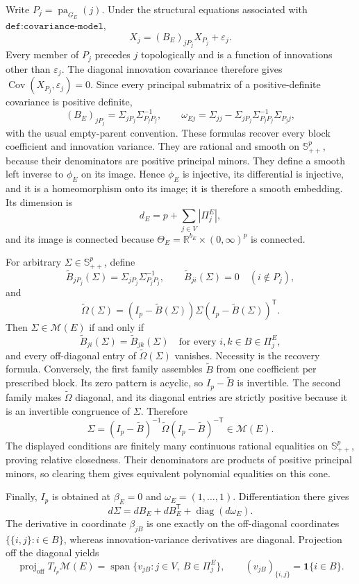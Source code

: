Write \(P_j=\operatorname{pa}_{G_E}(j)\). Under the structural equations associated with \(\texttt{def:covariance-model}\),
\[
 X_j=(B_E)_{jP_j}X_{P_j}+\varepsilon_j.
\]
Every member of \(P_j\) precedes \(j\) topologically and is a function of innovations other than \(\varepsilon_j\). The diagonal innovation covariance therefore gives \(\operatorname{Cov}(X_{P_j},\varepsilon_j)=0\). Since every principal submatrix of a positive-definite covariance is positive definite,
\[
 (B_E)_{jP_j}=\Sigma_{jP_j}\Sigma_{P_jP_j}^{-1},
 \qquad
 \omega_{Ej}=\Sigma_{jj}-\Sigma_{jP_j}\Sigma_{P_jP_j}^{-1}\Sigma_{P_jj},
\]
with the usual empty-parent convention. These formulas recover every block coefficient and innovation variance. They are rational and smooth on \(\mathbb S^p_{++}\), because their denominators are positive principal minors. They define a smooth left inverse to \(\phi_E\) on its image. Hence \(\phi_E\) is injective, its differential is injective, and it is a homeomorphism onto its image; it is therefore a smooth embedding. Its dimension is
\[
 d_E=p+\sum_{j\in V}|\Pi^E_j|,
\]
and its image is connected because \(\Theta_E=\mathbb R^{b_E}\times(0,\infty)^p\) is connected.

For arbitrary \(\Sigma\in\mathbb S^p_{++}\), define
\[
 \widetilde B_{jP_j}(\Sigma)=\Sigma_{jP_j}\Sigma_{P_jP_j}^{-1},
 \qquad
 \widetilde B_{ji}(\Sigma)=0\quad(i\notin P_j),
\]
and
\[
 \widetilde\Omega(\Sigma)
 =(I_p-\widetilde B(\Sigma))\Sigma(I_p-\widetilde B(\Sigma))^{\mathsf T}.
\]
Then \(\Sigma\in\mathcal M(E)\) if and only if
\[
 \widetilde B_{ji}(\Sigma)=\widetilde B_{jk}(\Sigma)
 \quad\text{for every }i,k\in B\in\Pi^E_j,
\]
and every off-diagonal entry of \(\widetilde\Omega(\Sigma)\) vanishes. Necessity is the recovery formula. Conversely, the first family assembles \(\widetilde B\) from one coefficient per prescribed block. Its zero pattern is acyclic, so \(I_p-\widetilde B\) is invertible. The second family makes \(\widetilde\Omega\) diagonal, and its diagonal entries are strictly positive because it is an invertible congruence of \(\Sigma\). Therefore
\[
 \Sigma=(I_p-\widetilde B)^{-1}\widetilde\Omega(I_p-\widetilde B)^{-\mathsf T}\in\mathcal M(E).
\]
The displayed conditions are finitely many continuous rational equalities on \(\mathbb S^p_{++}\), proving relative closedness. Their denominators are products of positive principal minors, so clearing them gives equivalent polynomial equalities on this cone.

Finally, \(I_p\) is obtained at \(\beta_E=0\) and \(\omega_E=(1,\ldots,1)\). Differentiation there gives
\[
 d\Sigma=dB_E+dB_E^{\mathsf T}+\operatorname{diag}(d\omega_E).
\]
The derivative in coordinate \(\beta_{jB}\) is one exactly on the off-diagonal coordinates \(\{\{i,j\}:i\in B\}\), whereas innovation-variance derivatives are diagonal. Projection off the diagonal yields
\[
 \operatorname{proj}_{\mathrm{off}}T_{I_p}\mathcal M(E)
 =\operatorname{span}\{v_{jB}:j\in V,\ B\in\Pi^E_j\},
 \qquad
 (v_{jB})_{\{i,j\}}=\mathbf 1\{i\in B\}.
\]

